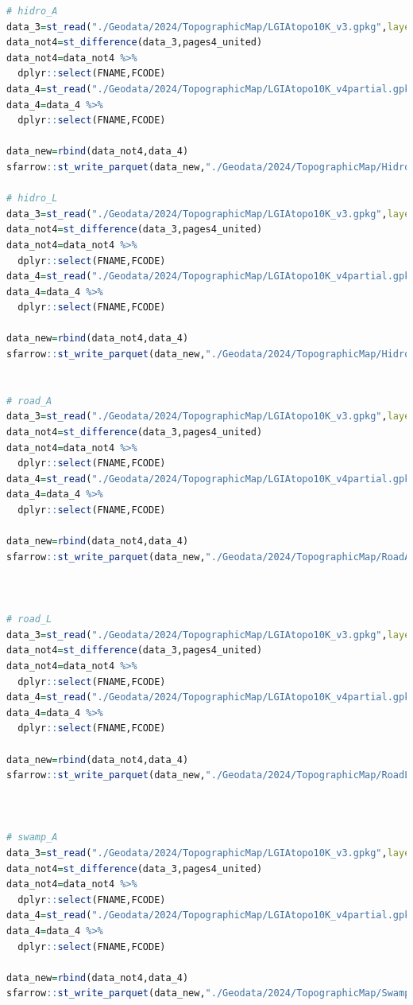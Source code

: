 \documentclass[
]{book}
\begin{document}
\begin{lstlisting}[language=R]
# hidro_A
data_3=st_read("./Geodata/2024/TopographicMap/LGIAtopo10K_v3.gpkg",layer="hidro_A")
data_not4=st_difference(data_3,pages4_united)
data_not4=data_not4 %>% 
  dplyr::select(FNAME,FCODE)
data_4=st_read("./Geodata/2024/TopographicMap/LGIAtopo10K_v4partial.gpkg",layer="hidro_A")
data_4=data_4 %>% 
  dplyr::select(FNAME,FCODE)

data_new=rbind(data_not4,data_4)
sfarrow::st_write_parquet(data_new,"./Geodata/2024/TopographicMap/HidroA_COMB.parquet")

# hidro_L
data_3=st_read("./Geodata/2024/TopographicMap/LGIAtopo10K_v3.gpkg",layer="hidro_L")
data_not4=st_difference(data_3,pages4_united)
data_not4=data_not4 %>% 
  dplyr::select(FNAME,FCODE)
data_4=st_read("./Geodata/2024/TopographicMap/LGIAtopo10K_v4partial.gpkg",layer="hidro_L")
data_4=data_4 %>% 
  dplyr::select(FNAME,FCODE)

data_new=rbind(data_not4,data_4)
sfarrow::st_write_parquet(data_new,"./Geodata/2024/TopographicMap/HidroL_COMB.parquet")


# road_A
data_3=st_read("./Geodata/2024/TopographicMap/LGIAtopo10K_v3.gpkg",layer="road_A")
data_not4=st_difference(data_3,pages4_united)
data_not4=data_not4 %>% 
  dplyr::select(FNAME,FCODE)
data_4=st_read("./Geodata/2024/TopographicMap/LGIAtopo10K_v4partial.gpkg",layer="road_A")
data_4=data_4 %>% 
  dplyr::select(FNAME,FCODE)

data_new=rbind(data_not4,data_4)
sfarrow::st_write_parquet(data_new,"./Geodata/2024/TopographicMap/RoadA_COMB.parquet")



# road_L
data_3=st_read("./Geodata/2024/TopographicMap/LGIAtopo10K_v3.gpkg",layer="road_L")
data_not4=st_difference(data_3,pages4_united)
data_not4=data_not4 %>% 
  dplyr::select(FNAME,FCODE)
data_4=st_read("./Geodata/2024/TopographicMap/LGIAtopo10K_v4partial.gpkg",layer="road_L")
data_4=data_4 %>% 
  dplyr::select(FNAME,FCODE)

data_new=rbind(data_not4,data_4)
sfarrow::st_write_parquet(data_new,"./Geodata/2024/TopographicMap/RoadL_COMB.parquet")



# swamp_A
data_3=st_read("./Geodata/2024/TopographicMap/LGIAtopo10K_v3.gpkg",layer="swamp_A")
data_not4=st_difference(data_3,pages4_united)
data_not4=data_not4 %>% 
  dplyr::select(FNAME,FCODE)
data_4=st_read("./Geodata/2024/TopographicMap/LGIAtopo10K_v4partial.gpkg",layer="swamp_A")
data_4=data_4 %>% 
  dplyr::select(FNAME,FCODE)

data_new=rbind(data_not4,data_4)
sfarrow::st_write_parquet(data_new,"./Geodata/2024/TopographicMap/SwampA_COMB.parquet")




\end{lstlisting}
\end{document}
